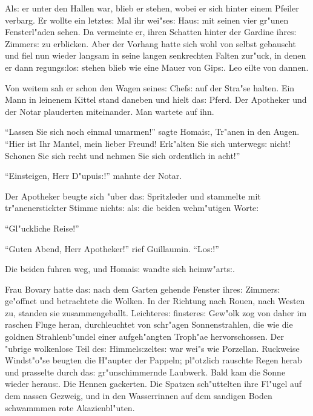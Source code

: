 \documentclass[oneside,12pt]{book}
\newcommand{\s}{s:}%
\begin{document}
Al{\s} er unter den Hallen war, blieb er stehen, wobei er sich
hinter einem Pfeiler verbarg. Er wollte ein letzte{\s} Mal ihr
wei"se{\s} Hau{\s} mit seinen vier gr"unen Fensterl"aden sehen. Da
vermeinte er, ihren Schatten hinter der Gardine ihre{\s}
Zimmer{\s} zu erblicken. Aber der Vorhang hatte sich wohl von
selbst gebauscht und fiel nun wieder langsam in seine langen
senkrechten Falten zur"uck, in denen er dann regung{\s}lo{\s}
stehen blieb wie eine Mauer von Gip{\s}. Leo eilte von dannen.

Von weitem sah er schon den Wagen seine{\s} Chef{\s} auf der
Stra"se halten. Ein Mann in leinenem Kittel stand daneben und
hielt da{\s} Pferd. Der Apotheker und der Notar plauderten
miteinander. Man wartete auf ihn.

"`Lassen Sie sich noch einmal umarmen!"' sagte Homai{\s}, Tr"anen
in den Augen. "`Hier ist Ihr Mantel, mein lieber Freund! Erk"alten
Sie sich unterweg{\s} nicht! Schonen Sie sich recht und nehmen Sie
sich ordentlich in acht!"'

"`Einsteigen, Herr D"upui{\s}!"' mahnte der Notar.

Der Apotheker beugte sich "uber da{\s} Spritzleder und stammelte
mit tr"a\-nen\-er\-stick\-ter Stimme nicht{\s} al{\s} die
beiden wehm"utigen Worte:

"`Gl"uckliche Reise!"'

"`Guten Abend, Herr Apotheker!"' rief Guillaumin. "`Lo{\s}!"'

Die beiden fuhren weg, und Homai{\s} wandte sich heimw"art{\s}.

\begin{center}
\makebox[15em]{\hrulefill}\bigskip
\end{center}

Frau Bovary hatte da{\s} nach dem Garten gehende Fenster ihre{\s}
Zimmer{\s} ge"offnet und betrachtete die Wolken. In der Richtung
nach Rouen, nach Westen zu, standen sie zusammengeballt.
Leichtere{\s} finstere{\s} Gew"olk zog von daher im raschen Fluge
heran, durchleuchtet von schr"agen Sonnenstrahlen, die wie die
goldnen Strahlenb"undel einer aufgeh"angten Troph"ae
hervorschossen. Der "ubrige wolkenlose Teil de{\s}
Himmel{\s}zelte{\s} war wei"s wie Porzellan. Ruckweise Windst"o"se
beugten die H"aupter der Pappeln; pl"otzlich rauschte Regen herab
und prasselte durch da{\s} gr"unschimmernde Laubwerk. Bald kam die
Sonne wieder herau{\s}. Die Hennen gackerten. Die Spatzen
sch"uttelten ihre Fl"ugel auf dem nassen Gezweig, und in den
Wasserrinnen auf dem sandigen Boden schwammmen rote
Akazienbl"uten.
\end{document}
